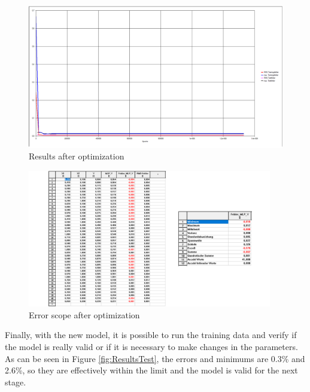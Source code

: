 \documentclass{article}
\begin{document}
\begin{doublespacing}
\begin{figure}[H] 
    \centering
    \includegraphics[width=1.0\textwidth]{Images/Fotos/Diapositiva8.PNG} 
    \caption{Results after optimization} 
    \label{fig:AfterPruning1} 
\end{figure}

\begin{figure}[H] 
    \centering
    \includegraphics[width=0.95\textwidth]{Images/Fotos/Diapositiva10.PNG} 
    \caption{Error scope after optimization} 
    \label{fig:AfterPruning2} 
\end{figure}

\par Finally, with the new model, it is possible to run the training data and verify if the model is really valid or if it is necessary to make changes in the parameters. As can be seen in Figure \ref{fig:ResultsTest}, the errors and minimums are 0.3\% and 2.6\%, so they are effectively within the limit and the model is valid for the next stage. 


\end{doublespacing}
\end{document}
